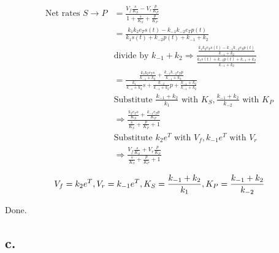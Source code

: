 \documentclass[8pt, fleqn]{report}
\begin{document}
\begin{align*}
    \text{Net rates } S \rightarrow P & = \frac{V_f \frac{s}{K_S} - V_r \frac{p}{K_P}}{1 + \frac{s}{K_S} + \frac{p}{K_P}}                                                                                                      \\
                                      & = \frac{k_1 k_2 e_T s(t) - k_{-1} k_{-2} e_T p(t)}{k_1 s(t) + k_{-2} p(t) + k_{-1} + k_2}                                                                                              \\
                                      & \text{divide by } k_{-1} + k_2 \Rightarrow \frac{\frac{k_1 k_2 e_T s(t) - k_{-1} k_{-2} e_T p(t)}{k_{-1} + k_2}}{\frac{k_1 s(t) + k_{-2} p(t) + k_{-1} + k_2}{k_{-1} + k_2}}           \\
                                      & = \frac{\frac{k_1 k_2 e_T s}{k_{-1} + k_2} + \frac{k_{-1} k_{-2} e_T p}{k_{-1} + k_2}}{\frac{k_1}{k_{-1} + k_2} s + \frac{k_{-2}}{k_{-1} + k_2} p + \frac{k_{-1} + k_2}{k_{-1} + k_2}} \\
                                      & \text{Substitute } \frac{k_{-1} + k_2}{k_1} \text{ with } K_S, \frac{k_{-1} + k_2}{k_{-2}} \text{ with } K_P                                                                           \\
                                      & \Rightarrow \frac{\frac{k_2 e_T s}{K_S} + \frac{k_{-1} e_T p}{K_P}}{\frac{s}{K_S} + \frac{p}{K_P} + 1}                                                                                 \\
                                      & \text{Substitute } k_2 e^T \text{ with } V_f, k_{-1} e^T \text{ with } V_r                                                                                                             \\
                                      & \Rightarrow \frac{V_f \frac{s}{K_S} + V_r \frac{p}{K_P}}{\frac{s}{K_S} + \frac{p}{K_P} + 1}
\end{align*}

\[
    V_f = k_2 e^T, V_r = k_{-1} e^T, K_S = \frac{k_{-1} + k_2}{k_1}, K_P = \frac{k_{-1} + k_2}{k_{-2}} \\
\]

Done.

\subsection*{c.}
\end{document}
